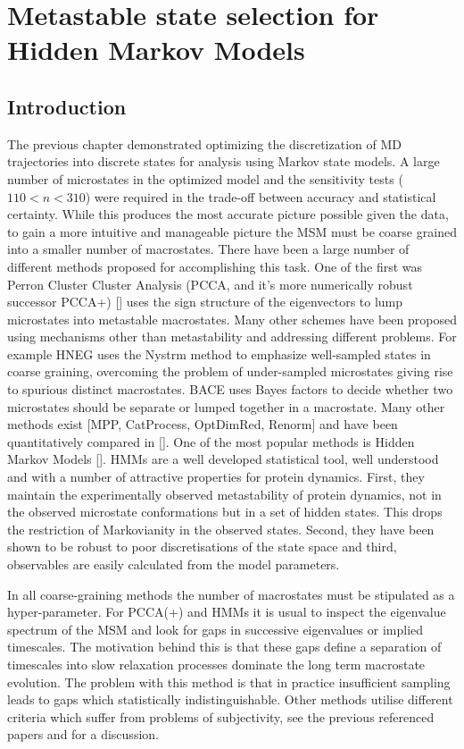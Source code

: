 \let\textcircled=\pgftextcircled
\chapter{Metastable state selection for Hidden Markov Models}
\label{chap:hmm}

\section{Introduction}
The previous chapter demonstrated optimizing the discretization of MD trajectories into discrete states for analysis using Markov state models. A large number of microstates in the optimized model and the sensitivity tests ($110 < n < 310$) were required in the trade-off between accuracy and statistical certainty. While this produces the most accurate picture possible given the data, to gain a more intuitive and manageable picture the MSM must be coarse grained into a smaller number of macrostates. There have been a large number of different methods proposed for accomplishing this task. One of the first was Perron Cluster Cluster Analysis (PCCA, and it's more numerically robust successor PCCA+)  []  uses the sign structure of the eigenvectors to lump microstates into metastable macrostates. Many other schemes have been proposed using mechanisms other than metastability and addressing different problems. For example HNEG uses the Nystrm method to emphasize well-sampled states in coarse graining, overcoming the problem of under-sampled microstates giving rise to spurious distinct macrostates.  BACE uses Bayes factors to decide whether two microstates should be separate or lumped together in a macrostate. Many other methods exist [MPP, CatProcess, OptDimRed, Renorm] and have been quantitatively compared in []. One of the most popular methods is Hidden Markov Models []. HMMs are a well developed statistical tool, well understood and with a number of attractive properties for protein dynamics. First, they maintain the experimentally observed metastability of protein dynamics, not in the observed microstate conformations but in a set of hidden states. This drops the restriction of Markovianity in the observed states. Second, they have been shown to be robust to poor discretisations of the state space and third, observables are easily calculated from the model parameters. 

In all coarse-graining methods the number of macrostates must be stipulated as a hyper-parameter. For PCCA(+) and HMMs it is usual to inspect the eigenvalue spectrum of the MSM and look for gaps in successive eigenvalues or implied timescales. The motivation behind this is that these gaps define a separation of timescales into slow relaxation processes dominate the long term macrostate evolution. The problem with this method is that in practice insufficient sampling leads to gaps which statistically indistinguishable.  Other methods utilise different criteria which suffer from problems of subjectivity,  see the previous referenced papers and \cite{bowmanQuantitativeComparisonAlternative2013} for a discussion.  

